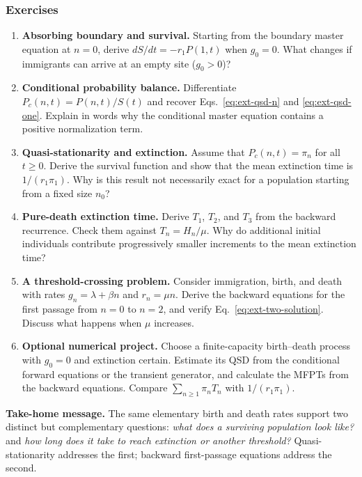 \subsubsection*{Exercises}
\begin{enumerate}
 \item \textbf{Absorbing boundary and survival.} Starting from the
 boundary master equation at $n=0$, derive
 $dS/dt=-r_1P(1,t)$ when $g_0=0$. What changes if immigrants can
 arrive at an empty site ($g_0>0$)?

 \item \textbf{Conditional probability balance.} Differentiate
 $P_c(n,t)=P(n,t)/S(t)$ and recover Eqs.~\eqref{eq:ext-qsd-n}
 and \eqref{eq:ext-qsd-one}. Explain in words why the conditional
 master equation contains a positive normalization term.

 \item \textbf{Quasi-stationarity and extinction.} Assume that
 $P_c(n,t)=\pi_n$ for all $t\geq0$. Derive the survival function and
 show that the mean extinction time is $1/(r_1\pi_1)$. Why is this
 result not necessarily exact for a population starting from a fixed
 size $n_0$?

 \item \textbf{Pure-death extinction time.} Derive $T_1$, $T_2$,
 and $T_3$ from the backward recurrence. Check them against
 $T_n=H_n/\mu$. Why do additional initial individuals contribute
 progressively smaller increments to the mean extinction time?

 \item \textbf{A threshold-crossing problem.} Consider immigration,
 birth, and death with rates $g_n=\lambda+\beta n$ and $r_n=\mu n$.
 Derive the backward equations for the first passage from $n=0$
 to $n=2$, and verify Eq.~\eqref{eq:ext-two-solution}. Discuss what
 happens when $\mu$ increases.

 \item \textbf{Optional numerical project.} Choose a finite-capacity
 birth--death process with $g_0=0$ and extinction certain. Estimate
 its QSD from the conditional forward equations or the transient
 generator, and calculate the MFPTs from the backward equations.
 Compare $\sum_{n\geq1}\pi_nT_n$ with $1/(r_1\pi_1)$.
\end{enumerate}

\medskip
\noindent\textbf{Take-home message.} The same elementary birth and death
rates support two distinct but complementary questions: \emph{what does
a surviving population look like?} and \emph{how long does it take to
reach extinction or another threshold?} Quasi-stationarity addresses
the first; backward first-passage equations address the second.

